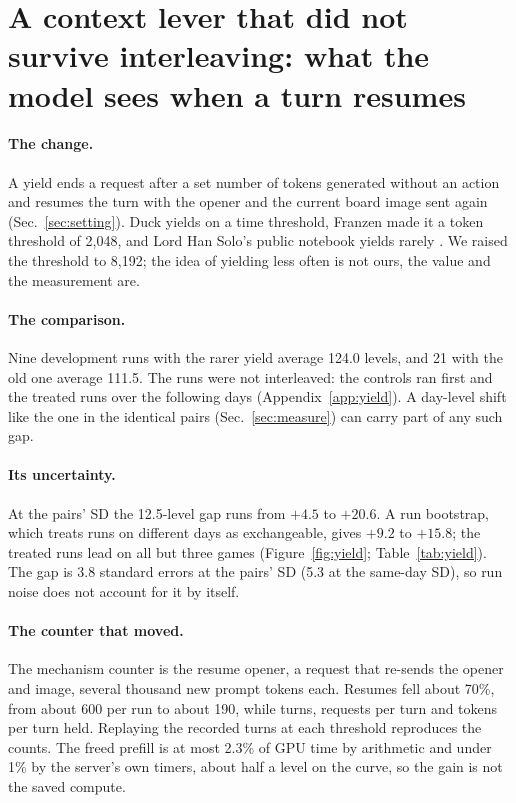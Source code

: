 \section{A context lever that did not survive interleaving: what the model sees when a turn resumes}\label{sec:yield}

\paragraph{The change.}
A yield ends a request after a set number of tokens generated without an action and resumes the turn with the opener and the current board image sent again (Sec.~\ref{sec:setting}).
Duck yields on a time threshold, Franzen made it a token threshold of 2,048, and Lord Han Solo's public notebook yields rarely \citep{bessis2026duck,franzen2026writeup}. %
We raised the threshold to 8,192; the idea of yielding less often is not ours, the value and the measurement are. %

\paragraph{The comparison.}
Nine development runs with the rarer yield average 124.0 levels, and 21 with the old one average 111.5. %
The runs were not interleaved: the controls ran first and the treated runs over the following days (Appendix~\ref{app:yield}). %
A day-level shift like the one in the identical pairs (Sec.~\ref{sec:measure}) can carry part of any such gap.

\paragraph{Its uncertainty.}
At the pairs' SD the 12.5-level gap runs from $+4.5$ to $+20.6$. %
A run bootstrap, which treats runs on different days as exchangeable, gives $+9.2$ to $+15.8$; the treated runs lead on all but three games (Figure~\ref{fig:yield}; Table~\ref{tab:yield}). The gap is 3.8 standard errors at the pairs' SD (5.3 at the same-day SD), so run noise does not account for it by itself. %

\paragraph{The counter that moved.}
The mechanism counter is the resume opener, a request that re-sends the opener and image, several thousand new prompt tokens each. %
Resumes fell about 70\%, from about 600 per run to about 190, while turns, requests per turn and tokens per turn held. %
Replaying the recorded turns at each threshold reproduces the counts. %
The freed prefill is at most 2.3\% of GPU time by arithmetic and under 1\% by the server's own timers, about half a level on the curve, so the gain is not the saved compute. %

